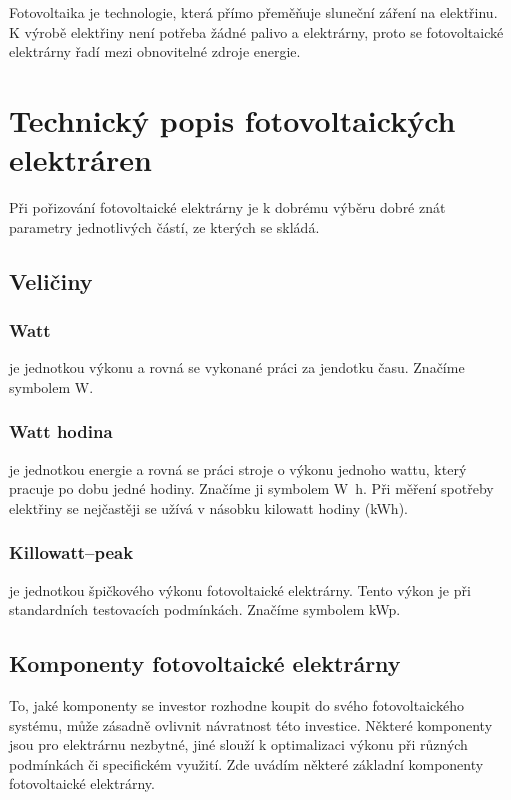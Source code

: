 Fotovoltaika je technologie, která přímo přeměňuje sluneční záření na elektřinu.
K výrobě elektřiny není potřeba žádné palivo a elektrárny, proto se fotovoltaické elektrárny řadí mezi obnovitelné zdroje energie.


\section{Technický popis fotovoltaických elektráren}

Při pořizování fotovoltaické elektrárny je k dobrému výběru dobré znát parametry jednotlivých částí, ze kterých se skládá.



\subsection{Veličiny}

\subsubsection{Watt} je jednotkou výkonu a rovná se vykonané práci za jendotku času.
Značíme symbolem \si{\watt}.

\subsubsection{Watt hodina} je jednotkou energie a rovná se práci stroje o výkonu jednoho wattu, který pracuje po dobu jedné hodiny.
Značíme ji symbolem \si{\watt\hour}. Při měření spotřeby elektřiny se nejčastěji se užívá v násobku kilowatt hodiny (\si{\kWh}).

\subsubsection{Killowatt--peak} je jednotkou špičkového výkonu fotovoltaické elektrárny. Tento výkon je při standardních testovacích podmínkách.
Značíme symbolem \si{\kW}p.


\subsection{Komponenty fotovoltaické elektrárny}
To, jaké komponenty se investor rozhodne koupit do svého fotovoltaického systému, může zásadně ovlivnit návratnost této investice.
Některé komponenty jsou pro elektrárnu nezbytné, jiné slouží k optimalizaci výkonu při různých podmínkách či specifickém využití.
Zde uvádím některé základní komponenty fotovoltaické elektrárny.

